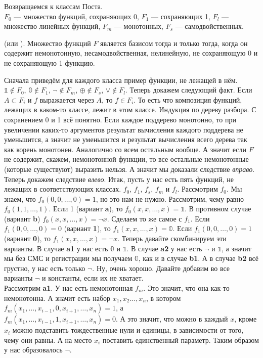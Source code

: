 \documentclass{article}
\begin{document}
\begin{itemize}
\begin{Comment}
            Возвращаемся к классам Поста.\\
            $F_0$ --- множество функций, сохраняющих 0, $F_1$ --- сохраняющих 1, $F_l$ --- множество линейных функций, $F_m$ --- монотонных, $F_s$ --- самодвойственных.
        \end{Comment}
        \thm {} (или ). Множество функций $F$ является базисом тогда и только тогда, когда он содержит немонотонную, несамодвойственная, нелинейную, не сохраняющую 0 и не сохраняющую 1 функцию.
        \begin{Proof}
            Сначала приведём для каждого класса пример функции, не лежащей в нём. $\mathbb1\notin F_0$, $\mathbb0\notin F_1$, $\neg\notin F_m$, $\oplus\notin F_s$, $\lor\notin F_l$. Теперь докажем следующий факт. Если $A\subset F_i$ и $f$ выражается через $A$, то $f\in F_i$. То есть что композиция функций, лежащих в каком-то классе, лежит в этом классе. Индукция по дереву разбора. С сохранением 0 и 1 всё понятно. Если каждое поддерево монотонно, то при увеличении каких-то аргументов результат вычисления каждого поддерева не уменьшится, а значит не уменьшится и результат вычисления всего дерева так как корень монотонен. Аналогично со всем остальным вообще. А значит если $F$ не содержит, скажем, немонотонной функции, то все остальные немонотонные (которые существуют) выразить нельзя. А значит мы доказали следствие \textit{вправо}.\\
            Теперь докажем следствие \textit{влево}.
            Итак, пусть у нас есть пять функций, не лежащих в соответствующих классах. $f_0$, $f_1$, $f_s$, $f_m$ и $f_l$. Рассмотрим $f_0$. Мы знаем, что $f_0(0,0,\ldots,0)=1$, но это нам не нужно. Рассмотрим, чему равно $f_0(1,1,\ldots,1)$. Если 1 (вариант \textbf a), то $f_0(x,x,\ldots,x)=\mathbb1$. В противном случае (вариант \textbf b) $f_0(x,x,\ldots,x)=\neg x$. Сделаем то же самое с $f_1$. Если $f_1(0,0,\ldots,0)=0$ (вариант \textbf 1), то $f_1(x,x,\ldots,x)=\mathbb0$. Если $f_1(0,0,\ldots,0)=1$ (вариант \textbf 0), то $f_1(x,x,\ldots,x)=\neg x$. Теперь давайте скомбинируем эти варианты. В случае \textbf{a1} у нас есть $\mathbb0$ и $\mathbb1$. В случае \textbf{a2} у нас есть $\neg$ и $\mathbb1$, а значит мы без СМС и регистрации мы получаем $\mathbb0$, как и в случае \textbf{b1}. А в случае \textbf{b2} всё грустно, у нас есть только $\neg$. Ну, очень хорошо. Давайте добавим во все варианты $\neg$ и константы, если их не хватает.\\
            Рассмотрим \textbf{a1}. У нас есть немонотонная $f_m$. Это значит, что она как-то немонотонна. А значит есть набор $x_1,x_2\ldots,x_n$, в котором $f_m(x_1,\ldots,x_{i-1},0,x_{i+1},\ldots,x_n)=1$, а\\$f_m(x_1,\ldots,x_{i-1},1,x_{i+1},\ldots,x_n)=0$. А это значит, что можно в каждый $x$, кроме $x_i$ можно подставить тождественные нули и единицы, в зависимости от того, чему они равны. А на место $x_i$ поставить единственный параметр. Таким образом у нас образовалось $\neg$.\\

\end{Proof}
\end{itemize}
\end{document}
